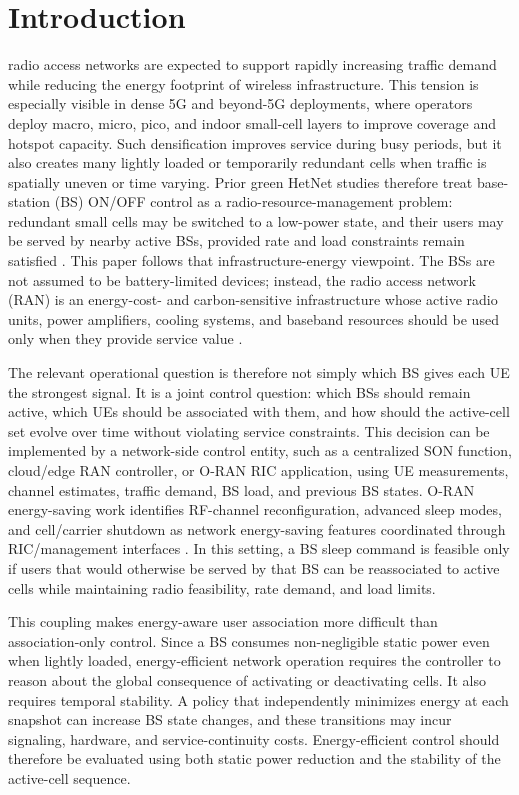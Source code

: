 \documentclass[journal]{IEEEtran}
\begin{document}
\section{Introduction}
 radio access networks are expected to support rapidly
increasing traffic demand while reducing the energy footprint of wireless
infrastructure. This tension is especially visible in dense 5G and beyond-5G
deployments, where operators deploy macro, micro, pico, and indoor small-cell
layers to improve coverage and hotspot capacity. Such densification improves
service during busy periods, but it also creates many lightly loaded or
temporarily redundant cells when traffic is spatially uneven or time varying.
Prior green HetNet studies therefore treat base-station (BS) ON/OFF control as
a radio-resource-management problem: redundant small cells may be switched to a
low-power state, and their users may be served by nearby active BSs, provided
rate and load constraints remain satisfied
\cite{ghazzai2017green,oh2013dynamic,feng2017onoff}. This paper follows that
infrastructure-energy viewpoint. The BSs are not assumed to be battery-limited
devices; instead, the radio access network (RAN) is an energy-cost- and
carbon-sensitive infrastructure whose active radio units, power amplifiers,
cooling systems, and baseband resources should be used only when they provide
service value \cite{oecd2025environmental,oran2025energy}.

The relevant operational question is therefore not simply which BS gives each
UE the strongest signal. It is a joint control question: which BSs should remain
active, which UEs should be associated with them, and how should the active-cell
set evolve over time without violating service constraints. This decision can
be implemented by a network-side control entity, such as a centralized SON
function, cloud/edge RAN controller, or O-RAN RIC application, using UE
measurements, channel estimates, traffic demand, BS load, and previous BS
states. O-RAN energy-saving work identifies RF-channel
reconfiguration, advanced sleep modes, and cell/carrier shutdown as network
energy-saving features coordinated through RIC/management interfaces
\cite{oran2025energy}. In this setting, a BS sleep command is feasible only
if users that would otherwise be served by that BS can be reassociated to
active cells while maintaining radio feasibility, rate demand, and load limits.

This coupling makes energy-aware user association more difficult than
association-only control. Since a BS consumes non-negligible static power even
when lightly loaded, energy-efficient network operation requires the controller
to reason about the global consequence of activating or deactivating cells.
It also requires temporal stability. A policy that independently minimizes
energy at each snapshot can increase BS state changes, and these transitions may
incur signaling, hardware, and service-continuity costs. Energy-efficient
control should therefore be evaluated using both static power reduction and
the stability of the active-cell sequence.
\end{document}
